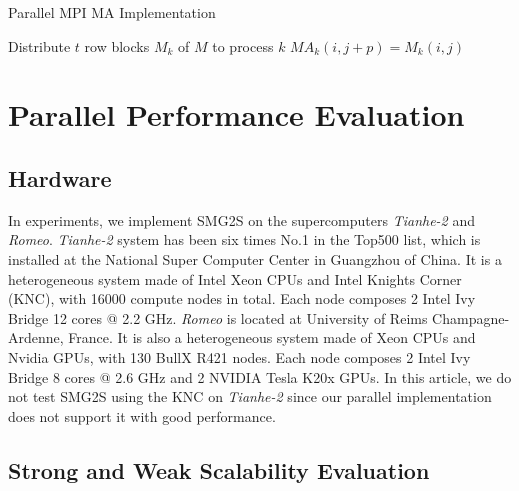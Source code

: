 \begin{algorithm}[t]{}
	\caption{Parallel MPI MA Implementation} 
	\label{alg:ma}   
	\begin{algorithmic}[1]
		\State Distribute $t$ row blocks $M_k$ of $M$ to process $k$ 
		\State $MA_k(i,j+p) = M_k(i,j)$
		\EndIf
		\EndFor
		\EndFor 
		\EndFunction
	\end{algorithmic} 
	
\end{algorithm}

\section{Parallel Performance Evaluation}\label{Parallel Performance Evaluation}
\subsection{Hardware}
In experiments, we implement SMG2S on the supercomputers \textit{Tianhe-2} and \textit{Romeo}. \textit{Tianhe-2} system has been six times No.1 in the Top500 list, which is installed at the National Super Computer Center in Guangzhou of China. It is a heterogeneous system made of Intel Xeon CPUs and Intel Knights Corner (KNC), with 16000 compute nodes in total. Each node composes 2 Intel Ivy Bridge 12 cores @ 2.2 GHz. \textit{Romeo} is located at University of Reims Champagne-Ardenne, France. It is also a heterogeneous system made of Xeon CPUs and Nvidia GPUs, with 130 BullX R421 nodes. Each node composes 2 Intel Ivy Bridge 8 cores @ 2.6 GHz and 2 NVIDIA Tesla K20x GPUs. In this article, we do not test SMG2S using the KNC on \textit{Tianhe-2} since our parallel implementation does not support it with good performance.
\subsection{Strong and Weak Scalability Evaluation}

